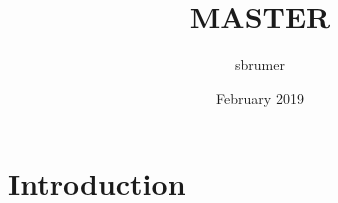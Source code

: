 \documentclass{article}
\title{MASTER}
\author{sbrumer }
\date{February 2019}
\begin{document}
\maketitle

\section{Introduction}
\end{document}
